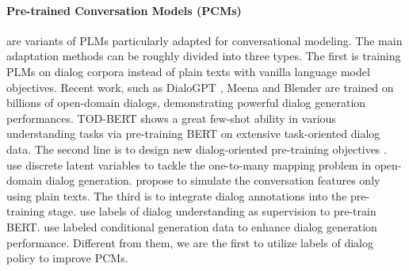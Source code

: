 \documentclass[letterpaper]{article} \usepackage{aaai22}  \usepackage{times}  \usepackage{helvet}  \usepackage{courier}  \usepackage[hyphens]{url}  \usepackage{graphicx} \urlstyle{rm} \def\UrlFont{\rm}  \usepackage{natbib}  \usepackage{caption} \DeclareCaptionStyle{ruled}{labelfont=normalfont,labelsep=colon,strut=off} \frenchspacing  \setlength{\pdfpagewidth}{8.5in}  \setlength{\pdfpageheight}{11in}  \usepackage{algorithm}
\begin{document}
\paragraph{Pre-trained Conversation Models (PCMs)} 
are variants of PLMs  particularly adapted for conversational modeling. The main adaptation methods can be roughly divided into three types. The first is training PLMs on dialog corpora instead of plain texts with vanilla language model objectives. 
Recent work, such as DialoGPT \cite{zhang2019dialogpt}, Meena \cite{adiwardana2020towards} and Blender \cite{roller2020recipes} are trained on billions of open-domain dialogs, demonstrating powerful dialog generation performances. 
TOD-BERT \cite{wu2020tod} shows a  great few-shot ability in various understanding tasks via pre-training BERT on extensive task-oriented dialog data.
The second line is to design new dialog-oriented pre-training objectives \cite{bao2020plato, he2020amalgamating, he2021multi, xu2021dialogue, su2021multitask, dai-etal-2021-preview}.
\citet{bao2020plato} use discrete latent variables to tackle the one-to-many mapping problem in open-domain dialog generation.
\citet{xu2021dialogue} propose to simulate the conversation features only using plain texts. 
The third is to integrate dialog annotations into the pre-training stage. \citet{yu2020score} use labels of dialog understanding as supervision to pre-train BERT.
\citet{peng2020few} use labeled conditional generation data to enhance dialog generation performance. Different from them, we are the first to utilize labels of dialog policy to improve PCMs.
\end{document}
